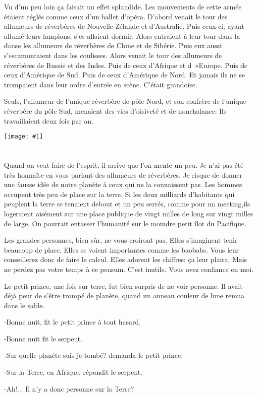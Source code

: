 \documentclass{report}
\newcommand{\parachapter}[2][]{\end{paracol}\chapter[#1]{#2}\begin{paracol}{2}}
\newcommand{\incpic}[1]{%
\end{paracol}
\begin{center}
    \texttt{[image: \#1]}
\end{center}
\begin{paracol}{2}}
\begin{document}
\begin{paracol}{2}
Vu d'un peu loin ça faisait un effet splandide. Les mouvements de cette armée étaient réglés comme ceux d'un ballet d'opéra. D'abord venait le tour des allumeurs de réverbères de Nouvelle-Zélande et d'Australie. Puis ceux-ci, ayant allumé leurs lampions, s'es allaient dormir. Alors entraient à leur tour dans la danse les allumeurs de réverbères de Chine et de Sibérie. Puis eux aussi s'escamontaient dans les coulisses. Alors venait le tour des allumeurs de réverbères de Russie et des Indes. Puis de ceux d'Afrique et d~»Europe. Puis de ceux d'Amérique de Sud. Puis de ceux d'Amérique de Nord. Et jamais ils ne se trompaient dans leur ordre d'entrée en scène. C'était grandoise.

Seuls, l'allumeur de l'unique réverbère de pôle Nord, et son confrère de l'unique réverbère du pôle Sud, menaient des vies d'oisiveté et de nonchalance: Ils travaillaient deux fois par an.

\incpic{pic/image32.png}

\parachapter{} %
Quand on veut faire de l'esprit, il arrive que l'on mente un peu. Je n'ai pas été très honnaîte en vous parlant des allumeurs de réverbères. Je risque de donner une fausse idée de notre planète à ceux qui ne la connaissent pas. Les hommes occupent très peu de place sur la terre. Si les deux milliards d'habitants qui peuplent la terre se tenaient debout et un peu serrés, comme pour un meeting,ils logeraient aisément sur une place publique de vingt milles de long sur vingt milles de large. On pourrait entasser l'humanité sur le moindre petit îlot du Pacifique.

Les grandes personnes, bien sûr, ne vous croiront pas. Elles s'imaginent tenir beaucoup de place. Elles se voient importantes comme les baobabs. Vous leur conseillerez donc de faire le calcul. Elles adorent les chiffres: ça leur plaira. Mais ne perdez pas votre temps à ce pensum. C'est inutile. Vous avez confiance en moi.

Le petit prince, une fois sur terre, fut bien surpris de ne voir personne. Il avait déjà peur de s'être trompé de planète, quand un anneau couleur de lune remua dans le sable.

-Bonne nuit, fit le petit prince à tout hasard.

-Bonne nuit fit le serpent.

-Sur quelle planète suis-je tombé? demanda le petit prince.

-Sur la Terre, en Afrique, répondit le serpent.

-Ah!... Il n'y a donc personne sur la Terre?


\end{paracol}
\end{document}
